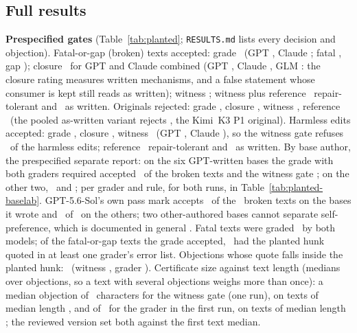\subsection{Full results}
\label{app:planted-results}
\textbf{Prespecified gates} (Table~\ref{tab:planted}; \texttt{RESULTS.md} lists every decision and objection). Fatal-or-gap (broken) texts accepted: grade \PLANTFAGRADE\ (GPT \PLANTFAGRADEGPT, Claude \PLANTFAGRADECLAUDE; fatal \PLANTFAFGRADE, gap \PLANTFAGGRADE); closure \PLANTFACLOSUREGC\ for GPT and Claude combined (GPT \PLANTFACLOSUREGPT, Claude \PLANTFACLOSURECLAUDE, GLM \PLANTFACLOSUREGLM: the closure rating measures written mechanisms, and a false statement whose consumer is kept still reads as written); witness \PLANTFAWITNESS; witness plus reference \PLANTFAREFADJWIT\ repair-tolerant and \PLANTFAREFADJWITAW\ as written. Originals rejected: grade \PLANTFRGRADE, closure \PLANTFRCLOSUREGC, witness \PLANTFRWITNESS, reference \PLANTFRREFADJWIT\ (the pooled as-written variant rejects \PLANTFRREFADJAW, the Kimi~K3 P1 original). Harmless edits accepted: grade \PLANTHGRADE, closure \PLANTHCLOSUREGC, witness \PLANTHWITNESS\ (GPT \PLANTHWITNESSGPT, Claude \PLANTHWITNESSCLAUDE), so the witness gate refuses \PLANTHREFUSEWITNESS\ of the harmless edits; reference \PLANTHREFADJWIT\ repair-tolerant and \PLANTHREFADJWITAW\ as written. By base author, the prespecified separate report: on the six GPT-written bases the grade with both graders required accepted \PLANTFAGRADEGPTAUTH\ of the broken texts and the witness gate \PLANTFAWITNESSGPTAUTH; on the other two, \PLANTFAGRADEOTHER\ and \PLANTFAWITNESSOTHER; per grader and rule, for both runs, in Table~\ref{tab:planted-baselab}. GPT-5.6-Sol's own pass mark accepts \CRGPTPassBrokenAccGptBasesP\ of the \CRNBrokenGptBases\ broken texts on the bases it wrote and \CRGPTPassBrokenAccOtherBasesP\ of \CRNBrokenOtherBases\ on the others; two other-authored bases cannot separate self-preference, which is documented in general \citep{panickssery2024self}. Fatal texts were graded \PLANTFGRADERANGE\ by both models; of the fatal-or-gap texts the grade accepted, \PLANTNAMEDGRADE\ had the planted hunk quoted in at least one grader's error list. Objections whose quote falls inside the planted hunk: \PLANTLOCUS\ (witness \PLANTLOCUSWITNESS, grader \PLANTLOCUSGRADE). Certificate size against text length (medians over objections, so a text with several objections weighs more than once): a median objection of \CRCertWitnessChars\ characters for the witness gate (one run), on texts of median length \CRCertWitnessTextChars, and of \CRCertGradeChars\ for the grader in the first run, on texts of median length \CRCertGradeTextChars; the reviewed version set both against the first text median.

